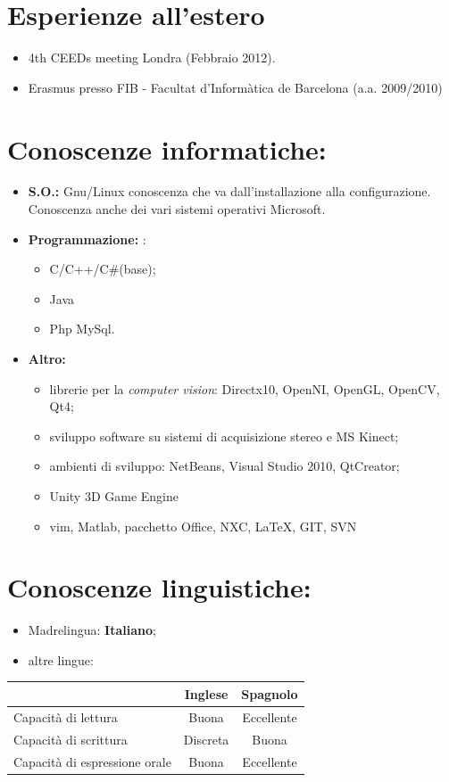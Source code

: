 \documentclass[pdftex,a4paper,10pt,twoside,titlepage,italian]{article}
\begin{document}
\section*{Esperienze all'estero}
\begin{itemize}
	\item 4th CEEDs meeting Londra (Febbraio 2012).
	\item Erasmus presso FIB - Facultat d’Informàtica de Barcelona (a.a. 2009/2010)
\end{itemize}

\section*{Conoscenze informatiche:}
\begin{itemize}
	\item \textbf{S.O.:} Gnu/Linux conoscenza 	che va dall'installazione alla configurazione. Conoscenza anche dei vari 
	sistemi operativi Microsoft.
	\item \textbf{Programmazione: }:
	\begin{itemize}
	\item C/C++/C\#(base);
	\item Java
	\item Php MySql.
	\end{itemize}
	\item \textbf{Altro: }
	\begin{itemize}
	\item librerie per la {\itshape computer vision}: Directx10, OpenNI, OpenGL, OpenCV, Qt4;
	\item sviluppo software su sistemi di acquisizione stereo e MS Kinect;
	\item ambienti di sviluppo: NetBeans, Visual Studio 2010, QtCreator;
	\item Unity 3D Game Engine
	\item vim, Matlab, pacchetto Office, NXC, \LaTeX, GIT, SVN
	\end{itemize}
\end{itemize}
\section*{Conoscenze linguistiche:}
\begin{itemize}
	\item Madrelingua: \textbf{Italiano};
	\item altre lingue:
\end{itemize}
\begin{center}
	\begin{tabular}{|l|c|c|}
	\hline
	&\textbf{Inglese} & \textbf{Spagnolo}\\
	\hline
	Capacità di lettura & Buona & Eccellente\\
	\hline
	Capacità di scrittura & Discreta & Buona \\
	\hline
	Capacità di espressione orale & Buona & Eccellente \\
	\hline
	\end{tabular}
\end{center}
\end{document}
